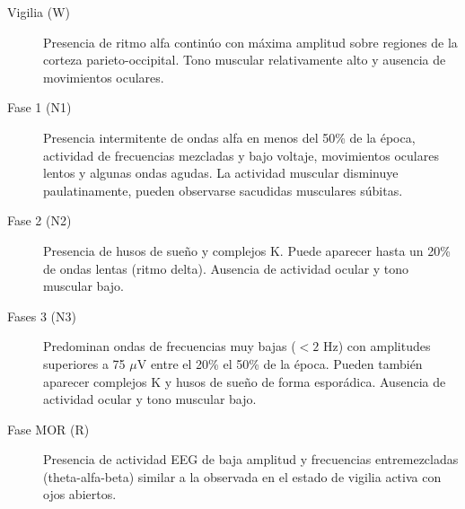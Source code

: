 \begin{description}
\item[Vigilia (W)] Presencia de ritmo alfa continúo con máxima amplitud sobre regiones de la 
corteza parieto-occipital. Tono muscular relativamente alto y ausencia de movimientos oculares.

\item[Fase 1 (N1)] 
Presencia intermitente de ondas alfa en menos del 50\% de la época, actividad de frecuencias 
mezcladas y bajo voltaje, movimientos oculares lentos y algunas ondas agudas. 
La actividad muscular disminuye paulatinamente, pueden observarse sacudidas musculares súbitas.

\item[Fase 2 (N2)] Presencia de 
husos de sueño y complejos K. 
Puede aparecer hasta un 20\% de ondas lentas (ritmo delta). Ausencia de actividad ocular y tono 
muscular bajo.

\item[Fases 3 (N3)] Predominan ondas de frecuencias muy bajas ($<2$ Hz) con amplitudes superiores a 
75 $\mu$V entre el 20\% el 50\% de la época. Pueden también aparecer complejos K y 
husos de sueño de forma esporádica. Ausencia de actividad ocular y tono muscular bajo.


\item[Fase MOR (R)] Presencia de actividad EEG de baja amplitud y frecuencias entremezcladas 
(theta-alfa-beta) similar a la observada en el estado de vigilia activa con ojos abiertos.
\end{description}


